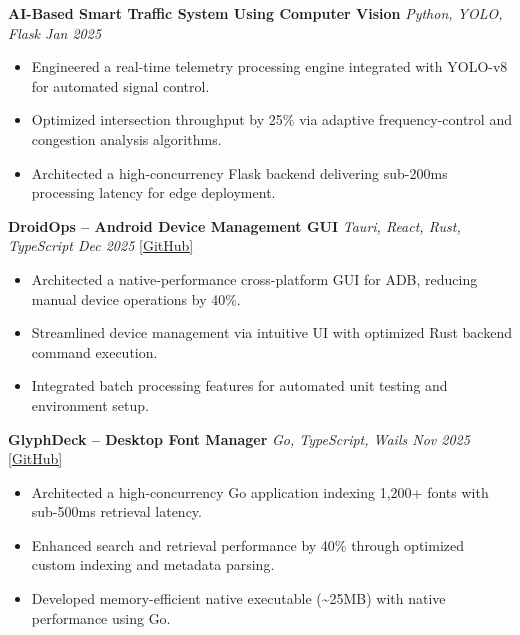 \documentclass[10pt, a4paper]{article}
\begin{document}
\vspace{2pt}

\textbf{AI-Based Smart Traffic System Using Computer Vision} \hfill \textit{Python, YOLO, Flask \quad Jan 2025}
\begin{itemize}
\item Engineered a real-time telemetry processing engine integrated with YOLO-v8 for automated signal control.
\item Optimized intersection throughput by 25\% via adaptive frequency-control and congestion analysis algorithms.
\item Architected a high-concurrency Flask backend delivering sub-200ms processing latency for edge deployment.
\end{itemize}

\vspace{2pt}

\textbf{DroidOps -- Android Device Management GUI} \hfill \textit{Tauri, React, Rust, TypeScript \quad Dec 2025} \quad \href{https://github.com/bbinxx/droidops}{[GitHub]}
\begin{itemize}
\item Architected a native-performance cross-platform GUI for ADB, reducing manual device operations by 40\%.
\item Streamlined device management via intuitive UI with optimized Rust backend command execution.
\item Integrated batch processing features for automated unit testing and environment setup.
\end{itemize}

\vspace{2pt}

\textbf{GlyphDeck -- Desktop Font Manager} \hfill \textit{Go, TypeScript, Wails \quad Nov 2025} \quad \href{https://github.com/bbinxx/GlyphDeck}{[GitHub]}
\begin{itemize}
\item Architected a high-concurrency Go application indexing 1,200+ fonts with sub-500ms retrieval latency.
\item Enhanced search and retrieval performance by 40\% through optimized custom indexing and metadata parsing.
\item Developed memory-efficient native executable (\textasciitilde25MB) with native performance using Go.
\end{itemize}

\end{document}
